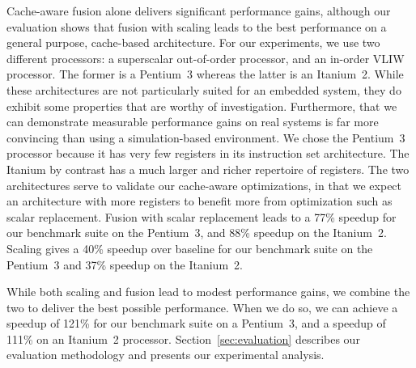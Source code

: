 Cache-aware fusion alone delivers significant performance gains, although our
evaluation shows that fusion with scaling leads to the best
performance on a general purpose, cache-based architecture. For our
experiments, we use two different processors: a superscalar out-of-order
processor, and an in-order VLIW processor. The former is a Pentium~3
whereas the latter is an Itanium~2. While these architectures are not
particularly suited for an embedded system, they do exhibit some
properties that are worthy of investigation. Furthermore, that we can
demonstrate measurable performance gains on real systems is far more
convincing than using a simulation-based environment. We chose the
Pentium~3 processor because it has very few registers in its
instruction set architecture. The Itanium by contrast has a much 
larger and richer repertoire of registers. The two architectures serve
to validate our cache-aware optimizations, in that we expect an
architecture with more registers to benefit more from optimization such
as scalar replacement. Fusion with scalar replacement leads to a 
77\% speedup for our benchmark suite on the Pentium~3, and 88\% speedup 
on the Itanium~2. Scaling gives a 40\% speedup over baseline for our 
benchmark suite on the Pentium~3 and 37\% speedup on the Itanium~2.

While both scaling and fusion lead to modest performance gains, we
combine the two to deliver the best possible performance. When we
do so, we can achieve a speedup of 121\% for our benchmark suite on a 
Pentium~3, and a speedup of 111\% on an Itanium~2 processor.
Section~\ref{sec:evaluation} describes our evaluation
methodology and presents our experimental analysis.


